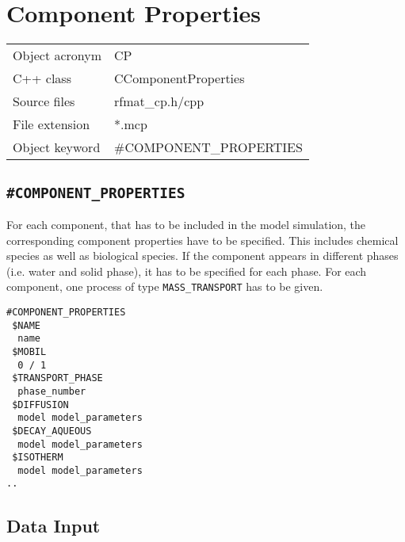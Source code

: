 \section{Component Properties}


\begin{tabular*}{8.35cm}{|p{2.5cm}|p{5cm}|} \hline
Object acronym & CP \\
C++ class      & CComponentProperties \\
Source files   & rfmat\_cp.h/cpp \\
\hline
File extension & *.mcp \\
Object keyword & \#COMPONENT\_PROPERTIES \\
\hline
\end{tabular*}


\subsection{\texttt{\bf\#COMPONENT\_PROPERTIES}}

For each component, that has to be included in the model simulation, the corresponding component properties have to be specified. This includes chemical species as well as biological species. If the component appears in different phases (i.e. water and solid phase), it has to be specified for each phase. For each component, one process of type \verb|MASS_TRANSPORT| has to be given.


\begin{verbatim}
#COMPONENT_PROPERTIES
 $NAME
  name
 $MOBIL
  0 / 1
 $TRANSPORT_PHASE
  phase_number
 $DIFFUSION
  model model_parameters
 $DECAY_AQUEOUS
  model model_parameters
 $ISOTHERM
  model model_parameters
..
\end{verbatim}

\subsection{Data Input}


